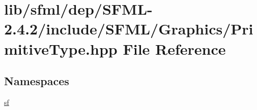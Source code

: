 \hypertarget{sfml_2dep_2_s_f_m_l-2_84_82_2include_2_s_f_m_l_2_graphics_2_primitive_type_8hpp}{\section{lib/sfml/dep/\-S\-F\-M\-L-\/2.4.2/include/\-S\-F\-M\-L/\-Graphics/\-Primitive\-Type.hpp File Reference}
\label{sfml_2dep_2_s_f_m_l-2_84_82_2include_2_s_f_m_l_2_graphics_2_primitive_type_8hpp}
}
\subsection*{Namespaces}
\begin{DoxyCompactItemize}
\item 
\hyperlink{namespacesf}{sf}
\end{DoxyCompactItemize}
